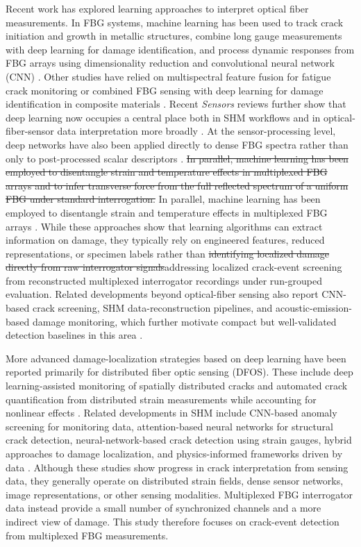 \documentclass[notspecified,article,submit,pdftex,moreauthors]{Definitions/mdpi}
\newcommand{\rev}[1]{{\color{red}#1}}
\newcommand{\revdel}[1]{{\color{red}\sout{#1}}}
\newcommand{\revcite}[1]{{\color{red}\cite{#1}}}
\begin{document}
Recent work has explored learning approaches to interpret optical fiber measurements. In FBG systems, machine learning has been used to track crack initiation and growth in metallic structures, combine long gauge measurements with deep learning for damage identification, and process dynamic responses from FBG arrays using dimensionality reduction and convolutional neural network (CNN) \cite{chilelli2019,zhang2020,wang2023}. Other studies have relied on multispectral feature fusion for fatigue crack monitoring or combined FBG sensing with deep learning for damage identification in composite materials \cite{zhao2025,xiong2025}. Recent \textit{Sensors} reviews further show that deep learning now occupies a central place both in SHM workflows and in optical-fiber-sensor data interpretation more broadly \cite{jia2023,cao2025}. At the sensor-processing level, deep networks have also been applied directly to dense FBG spectra rather than only to post-processed scalar descriptors \cite{kokhanovskiy2021}. \revdel{In parallel, machine learning has been employed to disentangle strain and temperature effects in multiplexed FBG arrays and to infer transverse force from the full reflected spectrum of a uniform FBG under standard interrogation.} \rev{In parallel, machine learning has been employed to disentangle strain and temperature effects in multiplexed FBG arrays \revcite{saha2025}.} While these approaches show that learning algorithms can extract information on damage, they typically rely on engineered features, reduced representations, or specimen labels rather than \revdel{identifying localized damage directly from raw interrogator signals}\rev{addressing localized crack-event screening from reconstructed multiplexed interrogator recordings under run-grouped evaluation}. \rev{Related developments beyond optical-fiber sensing also report CNN-based crack screening, SHM data-reconstruction pipelines, and acoustic-emission-based damage monitoring, which further motivate compact but well-validated detection baselines in this area \revcite{ali2021cnncrack,omoniyi2025,minh2025engstruct,minh2025measurement,pan2025compstruct,pan2025fracture,zhou2024ae}.}

More advanced damage-localization strategies based on deep learning have been reported primarily for distributed fiber optic sensing (DFOS). These include deep learning-assisted monitoring of spatially distributed cracks and automated crack quantification from distributed strain measurements while accounting for nonlinear effects \cite{liu2023,lu2025}. Related developments in SHM include CNN-based anomaly screening for monitoring data, attention-based neural networks for structural crack detection, neural-network-based crack detection using strain gauges, hybrid approaches to damage localization, and physics-informed frameworks driven by data \cite{kim2023,yuan2023,yoon2022,moreh2025,si2025}. Although these studies show progress in crack interpretation from sensing data, they generally operate on distributed strain fields, dense sensor networks, image representations, or other sensing modalities. Multiplexed FBG interrogator data instead provide a small number of synchronized channels and a more indirect view of damage. This study therefore focuses on crack-event detection from multiplexed FBG measurements.
\end{document}

